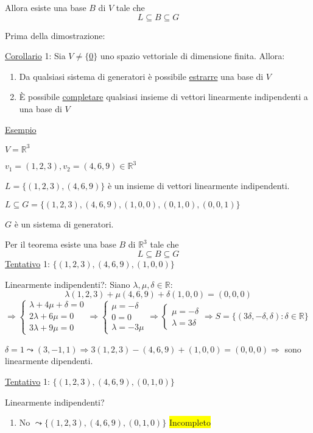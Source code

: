 \documentclass{article}
\newcommand{\hl}[1]{\colorbox{yellow}{#1}}
\newcommand{\ul}[1]{\underline{#1}}
\newcommand{\R}{\mathbb{R}}
\begin{document}
Allora esiste una base $B$ di $V$ tale che
$$L\subseteq B\subseteq G$$

Prima della dimostrazione:

\ul{Corollario} 1: Sia $V\not=\{$\ul{0}$\}$ uno spazio vettoriale di dimensione finita. Allora:
\begin{enumerate}
	\item Da qualsiasi sistema di generatori è possibile \ul{estrarre} una base di $V$
	\item È possibile \ul{completare} qualsiasi insieme di vettori linearmente indipendenti a una base di $V$
\end{enumerate}

\ul{Esempio}

$V=\R^3$

$v_1=(1,2,3),v_2=(4,6,9)\in\R^3$

$L=\{(1,2,3),(4,6,9)\}$ è un insieme di vettori linearmente indipendenti.

$L\subseteq G=\{(1,2,3),(4,6,9),(1,0,0),(0,1,0),(0,0,1)\}$

$G$ è un sistema di generatori.

Per il teorema esiste una base $B$ di $\R^3$ tale che
$$L\subseteq B\subseteq G$$
\ul{Tentativo} 1: $\{(1,2,3),(4,6,9),(1,0,0)\}$

Linearmente indipendenti?: Siano $\lambda,\mu,\delta\in\R:$
$$\lambda(1,2,3)+\mu(4,6,9)+\delta(1,0,0)=(0,0,0)$$
$\Rightarrow\begin{cases}
	\lambda+4\mu+\delta=0 \\
	2\lambda+6\mu=0       \\
	3\lambda+9\mu=0
\end{cases}\Rightarrow
\begin{cases}
	\mu=-\delta \\
	0=0         \\
	\lambda=-3\mu
\end{cases}\Rightarrow
\begin{cases}
	\mu=-\delta \\
	\lambda=3\delta
\end{cases}\Rightarrow
S=\{(3\delta,-\delta,\delta):\delta\in\R\}$

$\delta=1\leadsto(3,-1,1)\Rightarrow3(1,2,3)-(4,6,9)+(1,0,0)=(0,0,0)\Rightarrow$ sono linearmente dipendenti.

\ul{Tentativo} 1: $\{(1,2,3),(4,6,9),(0,1,0)\}$

Linearmente indipendenti?
\begin{enumerate}
	\item No $\leadsto\{(1,2,3),(4,6,9),(0,1,0)\}$ \hl{Incompleto}
\end{enumerate}
\end{document}
